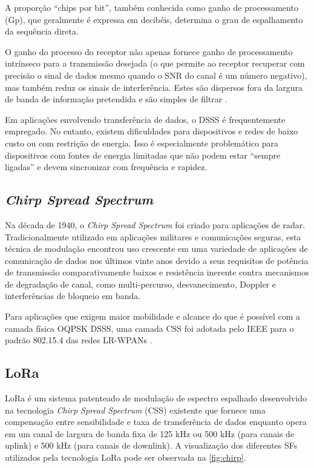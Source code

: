 \documentclass[
	12pt,				%
	openright,			%
	twoside,			%
	a4paper,			%
	english,			%
	french,				%
	spanish,			%
	brazil				%
	]{abntex2}
\newcommand{\quotes}[1]{``#1''}
\begin{document}
A proporção \quotes{chips por bit}, também conhecida como ganho de processamento (Gp), que geralmente é expressa em decibéis, determina o grau de espalhamento da sequência direta.

O ganho do processo do receptor não apenas fornece ganho de processamento intrínseco para a transmissão desejada (o que permite ao receptor recuperar com precisão o sinal de dados mesmo quando o SNR do canal é um número negativo), mas também reduz os sinais de interferência. Estes são dispersos fora da largura de banda de informação pretendida e são simples de filtrar \cite{semtech_2015}.

Em aplicações envolvendo transferência de dados, o DSSS é frequentemente empregado. No entanto, existem dificuldades para dispositivos e redes de baixo custo ou com restrição de energia. Isso é especialmente problemático para dispositivos com fontes de energia limitadas que não podem estar \quotes{sempre ligadas} e devem sincronizar com frequência e rapidez.

\subsection{\emph{Chirp Spread Spectrum}}

Na década de 1940, o \emph{Chirp Spread Spectrum} foi criado para aplicações de radar. Tradicionalmente utilizado em aplicações militares e comunicações seguras, esta técnica de modulação encontrou uso crescente em uma variedade de aplicações de comunicação de dados nos últimos vinte anos devido a seus requisitos de potência de transmissão comparativamente baixos e resistência inerente contra mecanismos de degradação de canal, como multi-percurso, desvanecimento, Doppler e interferências de bloqueio em banda.

Para aplicações que exigem maior mobilidade e alcance do que é possível com a camada física OQPSK DSSS, uma camada CSS foi adotada pelo IEEE para o padrão 802.15.4 das redes LR-WPANs \cite{semtech_2015}.

\subsection{LoRa}
\label{chap:lora}

LoRa é um sistema patenteado de modulação de espectro espalhado desenvolvido na tecnologia \emph{Chirp Spread Spectrum} (CSS) existente que fornece uma compensação entre sensibilidade e taxa de transferência de dados enquanto opera em um canal de largura de banda fixa de 125 kHz ou 500 kHz (para canais de uplink) e 500 kHz (para canais de downlink). A visualização dos diferentes SFs utilizados pela tecnologia LoRa pode ser observada na \autoref{fig:chirp}.
\end{document}
